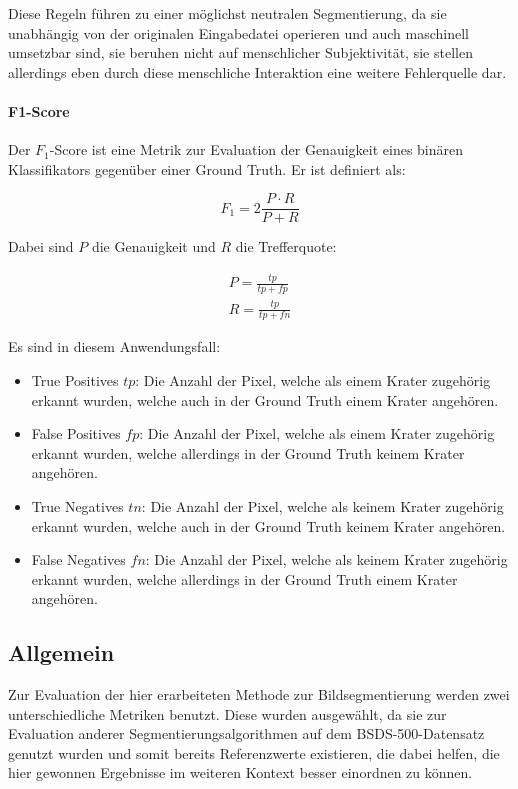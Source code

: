 Diese Regeln führen zu einer möglichst neutralen Segmentierung, da sie unabhängig von der originalen Eingabedatei operieren und auch maschinell umsetzbar sind, \dahe sie beruhen nicht auf menschlicher Subjektivität, sie stellen allerdings eben durch diese menschliche Interaktion eine weitere Fehlerquelle dar.

\paragraph{F1-Score}

Der $F_1$-Score ist eine Metrik zur Evaluation der Genauigkeit eines binären Klassifikators gegenüber einer Ground Truth. Er ist definiert als: \cite{chinchor_92}

\begin{equation}
F_1 = 2\frac{P\cdot R}{P+R}
\end{equation}

Dabei sind $P$ die Genauigkeit und $R$ die Trefferquote:

\begin{eqnarray}
P = \frac{tp}{tp+fp}\\
R = \frac{tp}{tp+fn}
\end{eqnarray}

Es sind in diesem Anwendungsfall:

\begin{itemize}
	\item{True Positives $tp$:} Die Anzahl der Pixel, welche als einem Krater zugehörig erkannt wurden, welche auch in der Ground Truth einem Krater angehören.
	\item{False Positives $fp$:} Die Anzahl der Pixel, welche als einem Krater zugehörig erkannt wurden, welche allerdings in der Ground Truth keinem Krater angehören.
	\item{True Negatives $tn$:} Die Anzahl der Pixel, welche als keinem Krater zugehörig erkannt wurden, welche auch in der Ground Truth keinem Krater angehören.
	\item{False Negatives $fn$:} Die Anzahl der Pixel, welche als keinem Krater zugehörig erkannt wurden, welche allerdings in der Ground Truth einem Krater angehören.
\end{itemize}

\subsection{Allgemein}
\label{ssec:eval_general}

Zur Evaluation der hier erarbeiteten Methode zur Bildsegmentierung werden zwei unterschiedliche Metriken benutzt. Diese wurden ausgewählt, da sie zur Evaluation anderer Segmentierungsalgorithmen auf dem BSDS-500-Datensatz \cite{bsd500} genutzt wurden und somit bereits Referenzwerte existieren, die dabei helfen, die hier gewonnen Ergebnisse im weiteren Kontext besser einordnen zu können. \cite{arbelaez_10}

